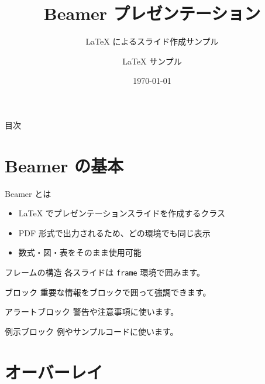 \documentclass[lualatex, unicode]{beamer}
\title{Beamer プレゼンテーション}
\subtitle{LaTeX によるスライド作成サンプル}
\author{LaTeX サンプル}
\institute{サンプル研究室}
\date{\today}
\begin{document}
\begin{frame}
  \titlepage
\end{frame}

\begin{frame}{目次}
  \tableofcontents
\end{frame}

\section{Beamer の基本}

\begin{frame}{Beamer とは}
  \begin{itemize}
    \item LaTeX でプレゼンテーションスライドを作成するクラス
    \item PDF 形式で出力されるため、どの環境でも同じ表示
    \item 数式・図・表をそのまま使用可能
  \end{itemize}
\end{frame}

\begin{frame}{フレームの構造}
  各スライドは \texttt{frame} 環境で囲みます。

  \begin{block}{ブロック}
    重要な情報をブロックで囲って強調できます。
  \end{block}

  \begin{alertblock}{アラートブロック}
    警告や注意事項に使います。
  \end{alertblock}

  \begin{exampleblock}{例示ブロック}
    例やサンプルコードに使います。
  \end{exampleblock}
\end{frame}

\section{オーバーレイ}
\end{document}
